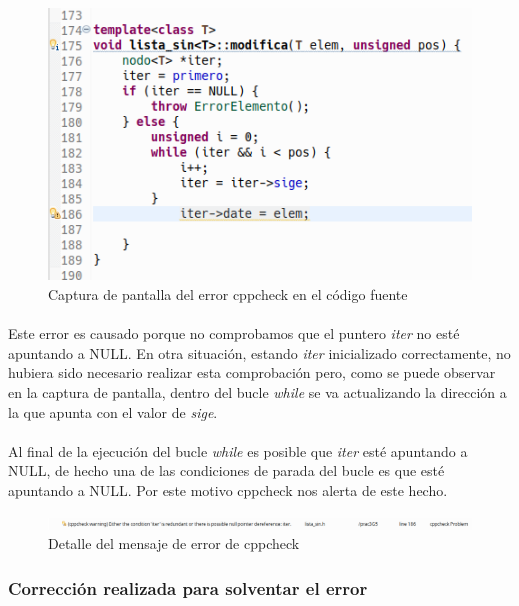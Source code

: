 			\begin{figure}[H]
				\centering
				\includegraphics[scale=0.55]{img/captura89.png}
				\caption{Captura de pantalla del error cppcheck en el código fuente}
				\label{captura89}
			\end{figure}
		
			\paragraph{}Este error es causado porque no comprobamos que el puntero \textit{iter} no esté apuntando a NULL. En otra situación, estando \textit{iter} inicializado correctamente, no hubiera sido necesario realizar esta comprobación pero, como se puede observar en la captura de pantalla, dentro del bucle \textit{while} se va actualizando la dirección a la que apunta con el valor de \textit{sige}. 
			
			\paragraph{}Al final de la ejecución del bucle \textit{while} es posible que \textit{iter} esté apuntando a NULL, de hecho una de las condiciones de parada del bucle es que esté apuntando a NULL. Por este motivo cppcheck nos alerta de este hecho.
		
			\begin{figure}[H]
				\centering
				\includegraphics[scale=0.38]{img/captura88.png}
				\caption{Detalle del mensaje de error de cppcheck}
				\label{captura88}
			\end{figure}
		
		\subsubsection{Corrección realizada para solventar el error}
		
